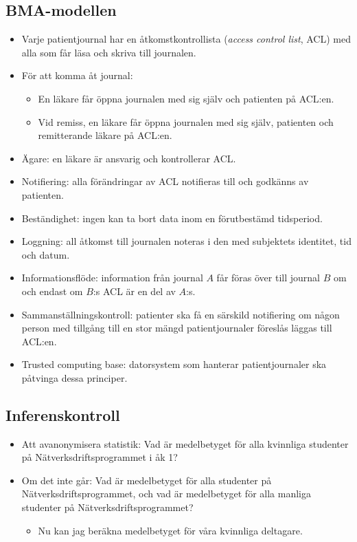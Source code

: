 \subsection{BMA-modellen}
\begin{frame}[allowframebreaks]{\insertsubsectionhead}
  \begin{itemize}
    \item Varje patientjournal har en åtkomstkontrollista (\emph{access control 
      list}, ACL) med alla som får läsa och skriva till journalen.
    \item För att komma åt journal:
      \begin{itemize}
        \item En läkare får öppna journalen med sig själv och patienten på 
          ACL:en.
        \item Vid remiss, en läkare får öppna journalen med sig själv, 
          patienten och remitterande läkare på ACL:en.
      \end{itemize}
    \item Ägare: en läkare är ansvarig och kontrollerar ACL.
    \item Notifiering: alla förändringar av ACL notifieras till och godkänns av 
      patienten.
    \item Beständighet: ingen kan ta bort data inom en förutbestämd tidsperiod.
    \item Loggning: all åtkomst till journalen noteras i den med subjektets 
      identitet, tid och datum.
    \item Informationsflöde: information från journal \(A\) får föras över till 
      journal \(B\) om och endast om \(B\):s ACL är en del av \(A\):s.
    \item Sammanställningskontroll: patienter ska få en särskild notifiering om 
      någon person med tillgång till en stor mängd patientjournaler föreslås 
      läggas till ACL:en.
    \item Trusted computing base: datorsystem som hanterar patientjournaler ska 
      påtvinga dessa principer.
  \end{itemize}
\end{frame}

\subsection{Inferenskontroll}
\begin{frame}{\insertsubsectionhead}
  \begin{itemize}
    \item Att avanonymisera statistik: Vad är medelbetyget för alla kvinnliga 
      studenter på Nätverksdriftsprogrammet i åk 1?
    \item Om det inte går: Vad är medelbetyget för alla studenter på 
      Nätverksdriftsprogrammet, och vad är medelbetyget för alla manliga 
      studenter på Nätverksdriftsprogrammet?
      \begin{itemize}
        \item Nu kan jag beräkna medelbetyget för våra kvinnliga deltagare.
      \end{itemize}
  \end{itemize}
\end{frame}



\begin{frame}[allowframebreaks]
  \printbibliography
\end{frame}
